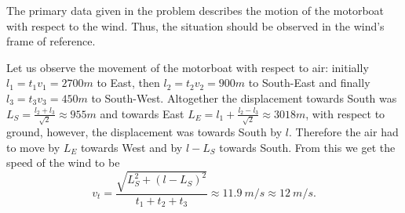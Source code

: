 \hinteng
The primary data given in the problem describes the motion of the motorboat with respect to the wind. Thus, the situation should be observed in the wind’s frame of reference.

\solueng
Let us observe the movement of the motorboat with respect to air: initially $l_1=t_1v_1=\SI{2700}m$ to East, then $l_2=t_2v_2=\SI{900}m$ to South-East and finally $l_3=t_3v_3=\SI{450}m$ to South-West. Altogether the displacement towards South was $L_S=\frac{l_2+l_3}{\sqrt 2}\approx \SI{955}m$ and towards East $L_E=l_1+\frac{l_2-l_3}{\sqrt 2}\approx \SI{3018}m$, with respect to ground, however, the displacement was towards South by $l$. Therefore the air had to move by $L_E$ towards West and by $l-L_S$ towards South. From this we get the speed of the wind to be
$$v_t=\frac{\sqrt{L_S^2+(l-L_S)^2}}{t_1+t_2+t_3}\approx \SI{11.9}{m/s}\approx \SI{12}{m/s}.$$
\probend
